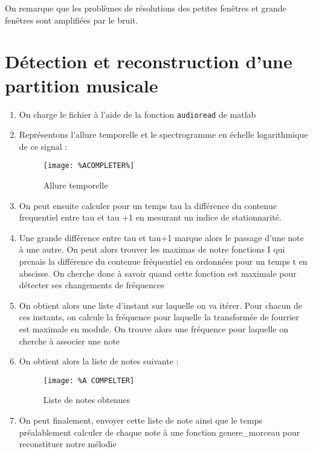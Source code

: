 \documentclass[12pt,a4paper,titlepage]{article}
\begin{document}
On remarque que les problèmes de résolutions des petites fenêtres et grande fenêtres sont amplifiées par le bruit.
\pagebreak

\section{Détection et reconstruction d'une partition musicale}

\begin{enumerate}

    \item{On charge le fichier à l'aide de la fonction \texttt{audioread} de matlab}

    \item{Représentons l'allure temporelle et le spectrogramme en échelle logarithmique de ce signal :
	\begin{figure}[H]
   		 \caption{Allure temporelle }
  		  \texttt{[image: \%ACOMPLETER\%]}
    	\centering
\end{figure}
        }

    \item{On peut ensuite calculer pour un temps tau la différence du contenue frequentiel entre tau et tau +1 en mesurant un indice de stationnarité.}

    \item{Une grande différence entre tau et tau+1 marque alors le passage d'une note à une autre. On peut alors trouver les maximas de notre fonctions I qui prenais la différence du contenue fréquentiel en ordonnées pour un temps t en abscisse. On cherche donc à savoir quand cette fonction est maximale pour détecter ses changements de fréquences }

    \item{On obtient alors une liste d'instant sur laquelle on va itérer. Pour chacun de ces instants, on calcule la fréquence pour laquelle la transformée de fourrier est maximale en module. On trouve alors une fréquence pour laquelle on cherche à associer une note}
    
    \item{On obtient alors la liste de notes suivante :
    \begin{figure}[H]
    	\caption{Liste de notes obtenues}
    	\texttt{[image: \%A COMPELTER]}
    \centering
\end{figure}}
    
    \item{On peut finalement, envoyer cette liste de note ainsi que le temps préalablement calculer de chaque note à une fonction genere_morceau pour reconstituer notre mélodie}

\end{enumerate}
\end{document}
